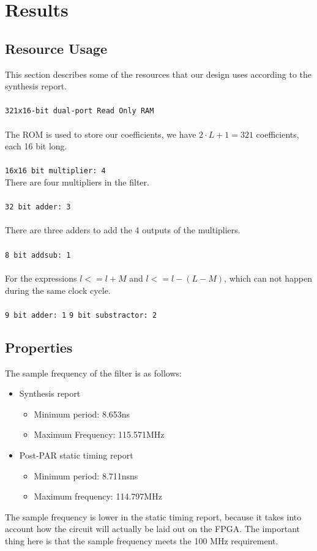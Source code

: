 \section{Results}
\subsection{Resource Usage}
This section describes some of the resources that our design uses according to the synthesis report.\\
\\
\texttt{321x16-bit dual-port Read Only RAM}\\
\\
The ROM is used to store our coefficients, we have $2\cdot L + 1 = 321$ coefficients, each 16 bit long.\\
\\
\texttt{16x16 bit multiplier: 4}
\\
There are four multipliers in the filter.\\
\\
\texttt{32 bit adder: 3}\\
\\
There are three adders to add the 4 outputs of the multipliers.\\
\\
\texttt{8 bit addsub: 1}\\
\\
For the expressions $l <= l + M$  and $l <= l - (L - M)$, which can not happen during the same clock cycle.\\
\\ 
\texttt{9 bit adder: 1}
\texttt{9 bit substractor: 2}
\subsection{Properties}
The sample frequency of the filter is as follows:
\begin{itemize}
\item
Synthesis report
\begin{itemize}
\item Minimum period: 8.653ns
\item Maximum Frequency: 115.571MHz
\end{itemize}
\item
Post-PAR static timing report
\begin{itemize}
\item  Minimum period:   8.711nsns  
\item Maximum frequency: 114.797MHz
\end{itemize}
\end{itemize}
The sample frequency is lower in the static timing report, because it takes into account how the circuit will actually be laid out on the FPGA. The important thing here is that the sample frequency meets the 100 MHz requirement.
